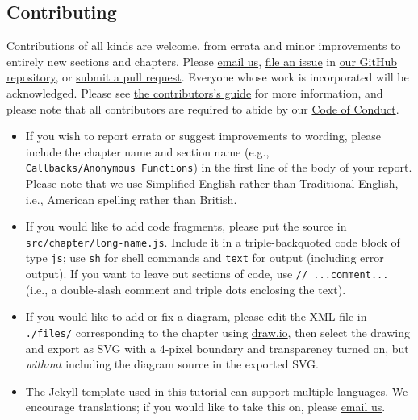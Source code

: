 \hypertarget{s:contributing}{\subsection{Contributing}\label{s:contributing}}

Contributions of all kinds are welcome, from errata and minor
improvements to entirely new sections and chapters. Please
\href{mailto:gvwilson@third-bit.com}{email us},
\href{https://github.com/software-tools-in-javascript/js-vs-ds/issues}{file
an issue} in
\href{https://github.com/software-tools-in-javascript/js-vs-ds/}{our
GitHub repository}, or
\href{https://github.com/software-tools-in-javascript/js-vs-ds/pulls}{submit
a pull request}. Everyone whose work is incorporated will be
acknowledged. Please see \protect\hyperlink{s:contributing}{the
contributors's guide} for more information, and please note that all
contributors are required to abide by our
\protect\hyperlink{s:conduct}{Code of Conduct}.

\begin{itemize}
\item
  If you wish to report errata or suggest improvements to wording,
  please include the chapter name and section name (e.g.,
  \texttt{Callbacks/Anonymous\ Functions}) in the first line of the body
  of your report. Please note that we use Simplified English rather than
  Traditional English, i.e., American spelling rather than British.
\item
  If you would like to add code fragments, please put the source in
  \texttt{src/chapter/long-name.js}. Include it in a triple-backquoted
  code block of type \texttt{js}; use \texttt{sh} for shell commands and
  \texttt{text} for output (including error output). If you want to
  leave out sections of code, use \texttt{//\ ...comment...} (i.e., a
  double-slash comment and triple dots enclosing the text).
\item
  If you would like to add or fix a diagram, please edit the XML file in
  \texttt{./files/} corresponding to the chapter using
  \href{https://www.draw.io/}{draw.io}, then select the drawing and
  export as SVG with a 4-pixel boundary and transparency turned on, but
  \emph{without} including the diagram source in the exported SVG.
\item
  The \href{https://jekyllrb.com/}{Jekyll} template used in this
  tutorial can support multiple languages. We encourage translations; if
  you would like to take this on, please
  \href{mailto:gvwilson@third-bit.com}{email us}.
\end{itemize}

